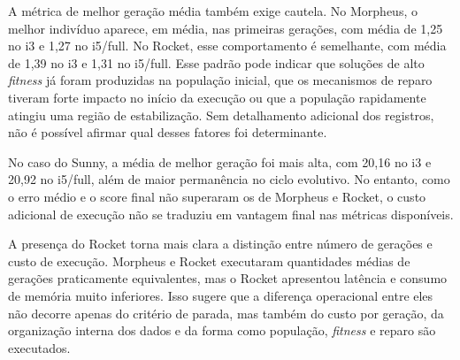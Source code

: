 A métrica de melhor geração média também exige cautela. No Morpheus, o melhor indivíduo aparece, em média, nas primeiras gerações, com média de 1,25 no i3 e 1,27 no i5/full. No Rocket, esse comportamento é semelhante, com média de 1,39 no i3 e 1,31 no i5/full. Esse padrão pode indicar que soluções de alto \textit{fitness} já foram produzidas na população inicial, que os mecanismos de reparo tiveram forte impacto no início da execução ou que a população rapidamente atingiu uma região de estabilização. Sem detalhamento adicional dos registros, não é possível afirmar qual desses fatores foi determinante.

No caso do Sunny, a média de melhor geração foi mais alta, com 20,16 no i3 e 20,92 no i5/full, além de maior permanência no ciclo evolutivo. No entanto, como o erro médio e o score final não superaram os de Morpheus e Rocket, o custo adicional de execução não se traduziu em vantagem final nas métricas disponíveis.

A presença do Rocket torna mais clara a distinção entre número de gerações e custo de execução. Morpheus e Rocket executaram quantidades médias de gerações praticamente equivalentes, mas o Rocket apresentou latência e consumo de memória muito inferiores. Isso sugere que a diferença operacional entre eles não decorre apenas do critério de parada, mas também do custo por geração, da organização interna dos dados e da forma como população, \textit{fitness} e reparo são executados.
